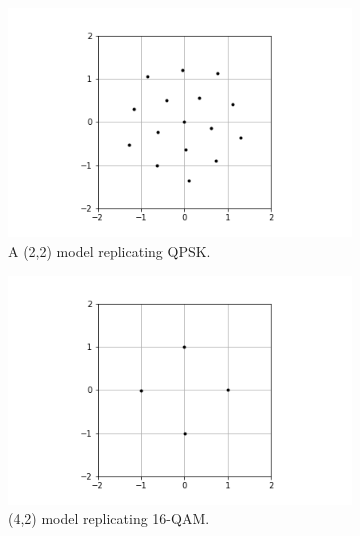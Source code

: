 \documentclass[12pt,onecolumn,letterpaper]{article}
\begin{document}
\begin{figure}[t!]
   \centering
   \begin{subfigure}[t]{0.24\textwidth}
       \centering
       \includegraphics[width=\linewidth]{figures/leaky_relu_7_4_constellation_diagram.png}
       \caption{A (2,2) model replicating QPSK.}
   \end{subfigure}
   \hfill
   \begin{subfigure}[t]{0.24\textwidth}
       \centering
       \includegraphics[width=\linewidth]{figures/leaky_relu_qpsk_constellation_diagram.png}
       \caption{(4,2) model replicating 16-QAM.}
   \end{subfigure}
   \hfill
   \begin{subfigure}[t]{0.24\textwidth}
       \centering

\end{subfigure}
\end{figure}
\end{document}
